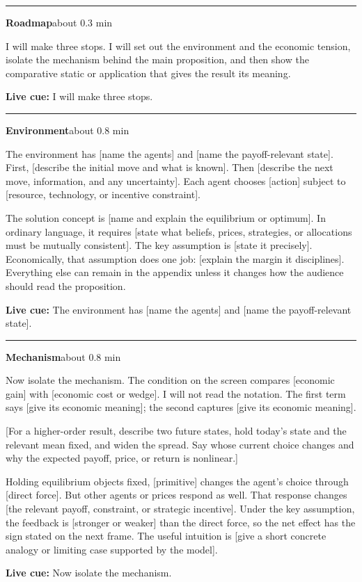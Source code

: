 \documentclass[11pt]{article}
\newcommand{\Cue}[1]{\par\nobreak\smallskip\noindent
  \textcolor{ScriptGray}{\footnotesize\textbf{Live cue:} #1}\par}
\newcommand{\scriptframe}[3]{%
  \Needspace{9\baselineskip}%
  \par\medskip\noindent\textcolor{ScriptBlue}{\rule{\linewidth}{0.55pt}}%
  \par\smallskip\noindent
  \textbf{#1}\hfill\textcolor{ScriptGray}{\small #2}\par\smallskip
  #3\par}
\begin{document}
\scriptframe{Roadmap}{about 0.3 min}{%
  I will make three stops. I will set out the environment and the economic
  tension, isolate the mechanism behind the main proposition, and then show
  the comparative static or application that gives the result its meaning.
  \Cue{I will make three stops.}
}

\scriptframe{Environment}{about 0.8 min}{%
  The environment has [name the agents] and [name the payoff-relevant state].
  First, [describe the initial move and what is known]. Then [describe the
  next move, information, and any uncertainty]. Each agent chooses [action]
  subject to [resource, technology, or incentive constraint].

  The solution concept is [name and explain the equilibrium or optimum]. In
  ordinary language, it requires [state what beliefs, prices, strategies, or
  allocations must be mutually consistent]. The key assumption is
  [state it precisely]. Economically, that assumption does one job: [explain
  the margin it disciplines]. Everything else can remain in the appendix
  unless it changes how the audience should read the proposition.
  \Cue{The environment has [name the agents] and [name the payoff-relevant state].}
}

\scriptframe{Mechanism}{about 0.8 min}{%
  Now isolate the mechanism. The condition on the screen compares [economic
  gain] with [economic cost or wedge]. I will not read the notation. The first
  term says [give its economic meaning]; the second captures [give its
  economic meaning].

  [For a higher-order result, describe two future states, hold today's state
  and the relevant mean fixed, and widen the spread. Say whose current choice
  changes and why the expected payoff, price, or return is nonlinear.]

  Holding equilibrium objects fixed, [primitive] changes the agent's choice
  through [direct force]. But other agents or prices respond as well. That
  response changes [the relevant payoff, constraint, or strategic incentive].
  Under the key assumption, the feedback is [stronger or weaker]
  than the direct force, so the net effect has the sign stated on the next
  frame. The useful intuition is [give a short concrete analogy or limiting
  case supported by the model].
  \Cue{Now isolate the mechanism.}
}
\end{document}
